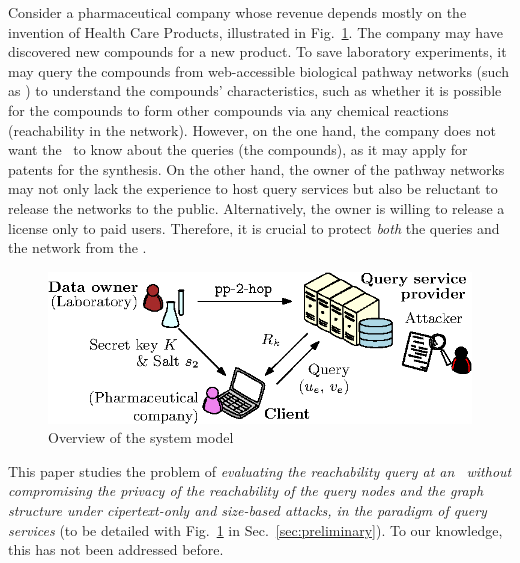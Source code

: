\stab
{} Consider a pharmaceutical company
whose revenue depends mostly on the invention of Health Care Products,
illustrated in Fig.~\ref{fig:overview}. The company may have
discovered new compounds for a new product. To save laboratory
experiments, it may query the compounds from web-accessible biological
pathway networks (such as \cite{biology}) to understand the compounds'
characteristics, such as whether it is possible for the compounds to
form other compounds via any chemical reactions (reachability in the
network). However, on the one hand, the company does not want the
\SP\ to know about the queries (the compounds), as it may apply for
patents for the synthesis. On the other hand, the owner of the pathway
networks may not only lack the experience to host query services but
also be reluctant to release the networks to the public.
Alternatively, the owner is willing to release a license only to paid
users.  Therefore, it is crucial to protect {\em both} the queries and
the network from the \SP.



\begin{figure}[t]
\includegraphics{./img/system.eps}
\caption{Overview of the system model}
\label{fig:overview}
\end{figure}

\stab
This paper studies the problem of {\em evaluating the reachability
  query at an \SP\ without compromising the privacy of the
  reachability of the query nodes and the graph structure under
  cipertext-only and size-based attacks, in the paradigm of query
  services} (to be detailed with Fig.~\ref{fig:overview} in
Sec.~\ref{sec:preliminary}). To our knowledge, this has not been  addressed before.



